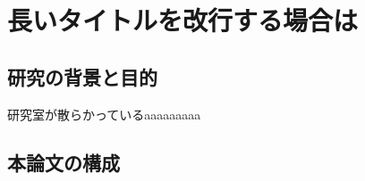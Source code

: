 \chapter[長いタdd(見出し用)]%
{長いタイトルを改行する場合は\\}
        \section{研究の背景と目的}

          研究室が散らかっているaaaaaaaaa

        \section{本論文の構成}

